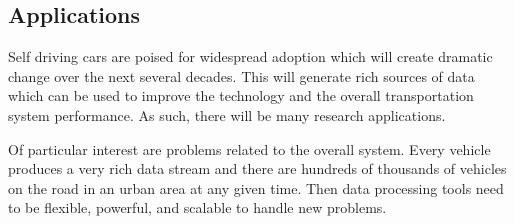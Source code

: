 \documentclass[12pt]{article}
\begin{document}
\subsection{Applications}

Self driving cars are poised for widespread adoption which will create
dramatic change over the next several decades. This will generate rich
sources of data which can be used to improve the technology and the overall
transportation system performance.\cite{swan2015connected}
As such, there will be many research applications.

Of particular interest are problems related to the overall system. Every
vehicle produces a very rich data stream and there are hundreds of
thousands of vehicles on the road in an urban area at any given time.
Then data processing tools need to be flexible, powerful, and scalable to
handle new problems.



 
\end{document}
